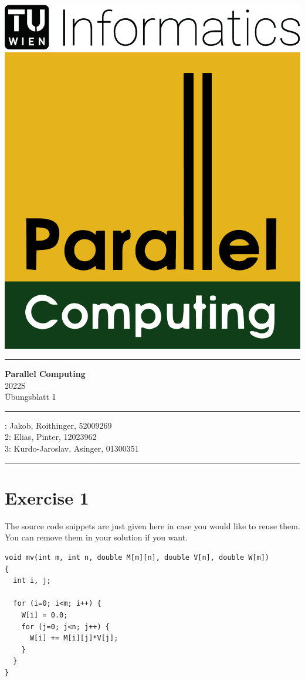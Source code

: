 \documentclass[a4paper,%
11pt,%
DIV=12,
headsepline,%
headings=normal,
]{scrartcl}
\newcounter{curex}
\newcommand{\exercise}[1]{\section*{Exercise #1}\setcounter{curex}{#1}}
\begin{document}
\noindent
\vspace*{1ex}
\begin{minipage}[t]{.45\linewidth}
\strut\vspace*{-\baselineskip}\newline
\includegraphics[height=.9cm]{./figs/Inf-Logo_black_en-eps-converted-to.pdf}
\includegraphics[height=.9cm]{./figs/par-logo}
\end{minipage}
\hfill
\begin{minipage}[t]{.5\linewidth}
\end{minipage}
\vspace*{1ex}

\hrule 

\vspace*{2ex}

\begin{center}
{\LARGE\textbf{Parallel Computing}}\\
{\large{}%
  2022S\\
  Übungsblatt 1\\
}
\end{center}

\hrule 
\vspace*{1ex}

: Jakob, Roithinger, 52009269\\
2: Elias, Pinter, 12023962\\
3: Kurdo-Jaroslav, Asinger, 01300351

\vspace*{1ex}
\hrule 

\exercise{1}

The source code snippets are just given here in case you would like to reuse them.
You can remove them in your solution if you want.
\begin{lstlisting}
void mv(int m, int n, double M[m][n], double V[n], double W[m])
{
  int i, j;

  for (i=0; i<m; i++) {
    W[i] = 0.0;
    for (j=0; j<n; j++) {
      W[i] += M[i][j]*V[j];
    }
  }
}
\end{lstlisting}
\end{document}
